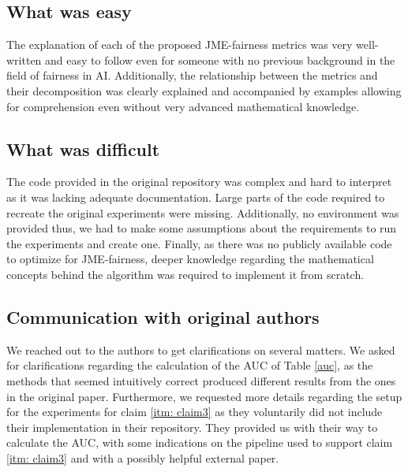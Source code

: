 \subsection{What was easy}
The explanation of each of the proposed JME-fairness metrics was very well-written and easy to follow even for someone with no previous background in the field of fairness in AI. Additionally, the relationship between the metrics and their decomposition was clearly explained and accompanied by examples allowing for comprehension even without very advanced mathematical knowledge.

\subsection{What was difficult}
The code provided in the original repository was complex and hard to interpret as it was lacking adequate documentation. Large parts of the code required to recreate the original experiments were missing. Additionally, no environment was provided thus, we had to make some assumptions about the requirements to run the experiments and create one.
Finally, as there was no publicly available code to optimize for JME-fairness, deeper knowledge regarding the mathematical concepts behind the algorithm was required to implement it from scratch.

\subsection{Communication with original authors}
We reached out to the authors to get clarifications on several matters. We asked for clarifications regarding the calculation of the AUC of Table \ref{auc}, as the methods that seemed intuitively correct produced different results from the ones in the original paper. Furthermore, we requested more details regarding the setup for the experiments for claim \ref{itm: claim3} as they voluntarily did not include their implementation in their repository. They provided us with their way to calculate the AUC, with some indications on the pipeline used to support claim \ref{itm: claim3} and with a possibly helpful external paper.

\newpage
